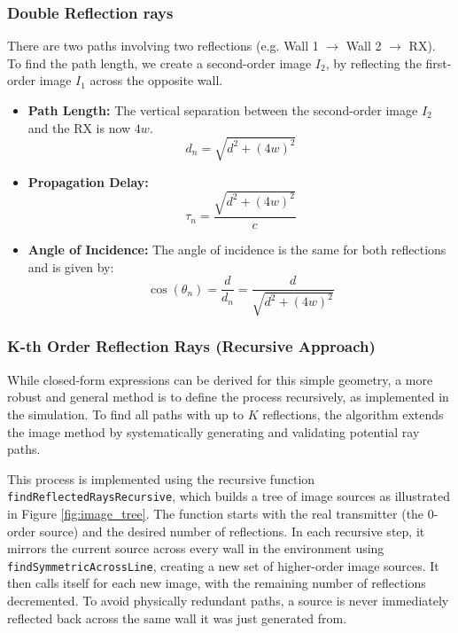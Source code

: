 \subsubsection{Double Reflection rays}
There are two paths involving two reflections (e.g. Wall 1 $\rightarrow$ Wall 2 $\rightarrow$ RX). To find the path length, we create a second-order image $I_2$, by reflecting the first-order image $I_1$ across the opposite wall.
\begin{itemize}
	\item \textbf{Path Length:} The vertical separation between the second-order image $I_2$ and the RX is now $4w$.
	\begin{equation}
		d_{n} = \sqrt{d^2 + (4w)^2}
	\end{equation}
	\item \textbf{Propagation Delay:}
	\begin{equation}
		\tau_{n} = \frac{\sqrt{d^2 + (4w)^2}}{c}
	\end{equation}
	 \item \textbf{Angle of Incidence:} The angle of incidence is the same for both reflections and is given by:
	\begin{equation}
		\cos(\theta_{n}) = \frac{d}{d_{n}} = \frac{d}{\sqrt{d^2 + (4w)^2}}
	\end{equation}
\end{itemize}


\subsubsection{K-th Order Reflection Rays (Recursive Approach)}
While closed-form expressions can be derived for this simple geometry, a more robust and general method is to define the process recursively, as implemented in the simulation. To find all paths with up to $K$ reflections, the algorithm extends the image method by systematically generating and validating potential ray paths.

This process is implemented using the recursive function \texttt{findReflectedRaysRecursive}, which builds a tree of image sources as illustrated in Figure \ref{fig:image_tree}. The function starts with the real transmitter (the 0-order source) and the desired number of reflections. In each recursive step, it mirrors the current source across every wall in the environment using \texttt{findSymmetricAcrossLine}, creating a new set of higher-order image sources. It then calls itself for each new image, with the remaining number of reflections decremented. To avoid physically redundant paths, a source is never immediately reflected back across the same wall it was just generated from.

